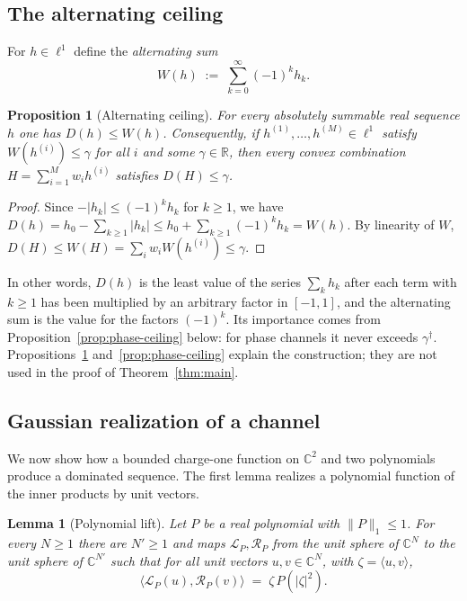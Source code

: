 \documentclass[11pt,reqno]{amsart}
\newtheorem{proposition}[theorem]{Proposition}
\newtheorem{lemma}[theorem]{Lemma}
\theoremstyle{definition}
\numberwithin{equation}{section}
\newcommand{\C}{\mathbb{C}}
\newcommand{\R}{\mathbb{R}}
\newcommand{\gd}{\gamma^\dagger}
\newcommand{\lone}[1]{\|#1\|_1}
\begin{document}
\subsection{The alternating ceiling}
For $h\in\ell^1$ define the \emph{alternating sum}
\[
  W(h) \;:=\; \sum_{k=0}^\infty (-1)^k h_k .
\]

\begin{proposition}[Alternating ceiling]\label{prop:nogo}
For every absolutely summable real sequence $h$ one has $D(h) \le W(h)$. Consequently, if $h^{(1)}, \dots, h^{(M)} \in \ell^1$ satisfy $W(h^{(i)}) \le \gamma$ for all $i$ and some $\gamma\in\R$, then every convex combination $H = \sum_{i=1}^M w_i h^{(i)}$ satisfies $D(H) \le \gamma$.
\end{proposition}

\begin{proof}
Since $-|h_k|\le(-1)^kh_k$ for $k\ge1$, we have $D(h) = h_0 - \sum_{k\ge1} |h_k| \le h_0 + \sum_{k\ge1} (-1)^k h_k = W(h)$. By linearity of $W$, $D(H) \le W(H) = \sum_{i} w_i W(h^{(i)}) \le \gamma$.
\end{proof}

In other words, $D(h)$ is the least value of the series $\sum_kh_k$ after each term with $k\ge1$ has been multiplied by an arbitrary factor in $[-1,1]$, and the alternating sum is the value for the factors $(-1)^k$. Its importance comes from Proposition~\ref{prop:phase-ceiling} below: for phase channels it never exceeds $\gd$. Propositions~\ref{prop:nogo} and~\ref{prop:phase-ceiling} explain the construction; they are not used in the proof of Theorem~\ref{thm:main}.

\subsection{Gaussian realization of a channel}\label{sec:realization}
We now show how a bounded charge-one function on $\C^2$ and two polynomials produce a dominated sequence. The first lemma realizes a polynomial function of the inner products by unit vectors.

\begin{lemma}[Polynomial lift]\label{lem:lift}
Let $P$ be a real polynomial with $\lone{P}\le1$. For every $N\ge1$ there are $N'\ge1$ and maps $\mathcal{L}_P,\mathcal{R}_P$ from the unit sphere of $\C^N$ to the unit sphere of $\C^{N'}$ such that for all unit vectors $u,v\in\C^N$, with $\zeta=\langle u,v\rangle$,
\[
  \langle \mathcal{L}_P(u),\mathcal{R}_P(v)\rangle \;=\; \zeta\,P(|\zeta|^2).
\]
\end{lemma}
\end{document}
